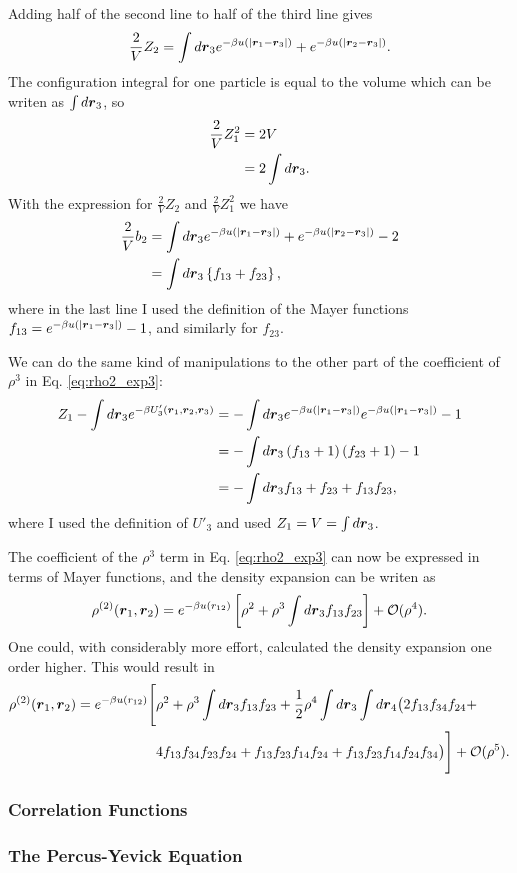 Adding half of the second line to half of the third line gives
\begin{align}
\frac{2}{V}Z_2 = \int d\boldsymbol{r}_3 
e^{-\beta u(|\boldsymbol{r}_1 - \boldsymbol{r}_3|)} + 
e^{-\beta u(|\boldsymbol{r}_2 - \boldsymbol{r}_3|)}.
\end{align}
The configuration integral for one particle is equal to the volume which can be writen as $\int d\boldsymbol{r}_3$, so
\begin{align}
\frac{2}{V} Z_1^2 &= 2 V \\
&= 2 \int d\boldsymbol{r}_3.
\end{align}
With the expression for $\frac{2}{V}Z_2$ and $\frac{2}{V}Z_1^2$ we have
\begin{align}
\frac{2}{V} b_2 &= \int d\boldsymbol{r}_3 
    e^{-\beta u(|\boldsymbol{r}_1 - \boldsymbol{r}_3|)} + 
    e^{-\beta u(|\boldsymbol{r}_2 - \boldsymbol{r}_3|)} - 2\\
&= \int d\boldsymbol{r}_3 \left\{ f_{13} + f_{23} \right\},
\end{align}
where in the last line I used the definition of the Mayer functions $f_{13} = e^{-\beta u(|\boldsymbol{r}_1 - \boldsymbol{r}_3|)} - 1$,
and similarly for $f_{23}$.

We can do the same kind of manipulations to the other part
of the coefficient of $\rho^3$ in Eq. \eqref{eq:rho2_exp3}:
\begin{align}
Z_1 -  \int d\boldsymbol{r}_3 e^{-\beta U'_3(\boldsymbol{r}_1,\boldsymbol{r}_2,\boldsymbol{r}_3)} &=
    - \int d\boldsymbol{r}_3 e^{-\beta u(|\boldsymbol{r}_1 - \boldsymbol{r}_3|)} 
    e^{-\beta u(|\boldsymbol{r}_1 - \boldsymbol{r}_3|)} -1 \\
&= - \int d\boldsymbol{r}_3 \left(f_{13}+ 1\right)\left(f_{23}+ 1\right) -1\\
&= - \int d\boldsymbol{r}_3 f_{13}+ f_{23} + f_{13}f_{23},
\end{align}
where I used the definition of $U'_3$ and used $Z_1=V=\int d\boldsymbol{r}_3$.

The coefficient of the $\rho^3$ term in Eq. \eqref{eq:rho2_exp3} can now be expressed in terms of Mayer functions, and the density expansion can be writen as
\begin{align}
\rho^{(2)}(\boldsymbol{r}_1,\boldsymbol{r}_2) = e^{-\beta u(r_{12})}
    \left[ \rho^2 + \rho^3 \int d\boldsymbol{r}_3 f_{13}f_{23} \right]
    + \mathcal{O}(\rho^4).
\end{align}
One could, with considerably more effort, calculated the density expansion one order higher.
This would result in
\begin{align}
\rho^{(2)}(\boldsymbol{r}_1,\boldsymbol{r}_2) = e^{-\beta u(r_{12})}
    \Bigg[& \rho^2 + \rho^3 \int d\boldsymbol{r}_3 f_{13}f_{23} 
        +\frac{1}{2} \rho^4 \int d\boldsymbol{r}_3 \int d\boldsymbol{r}_4
        \big( 2 f_{13}f_{34}f_{24} + \nonumber \\
            &4f_{13}f_{34}f_{23}f_{24} +
            f_{13}f_{23}f_{14}f_{24} +
            f_{13}f_{23}f_{14}f_{24}f_{34}
        \big)
    \Bigg]
    + \mathcal{O}(\rho^5).
\end{align}

\subsubsection{Correlation Functions}
\subsubsection{The Percus-Yevick Equation}
